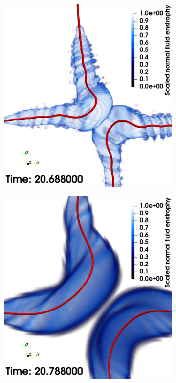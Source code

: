 \documentclass[%
 reprint,
 amsmath,amssymb,
 aps,
 prl,
]{revtex4-2}
\begin{document}
\begin{figure}
\begin{subfigure}[b]{0.24\textwidth}
	\end{subfigure}
    \begin{subfigure}[b]{0.24\textwidth}
		\centering
		\includegraphics*[width=\textwidth]{snap-3.pdf}
	\end{subfigure}
    \begin{subfigure}[b]{0.24\textwidth}
		\centering
		\includegraphics*[width=\textwidth]{snap-4.pdf}


\end{subfigure}
\end{figure}
\end{document}
